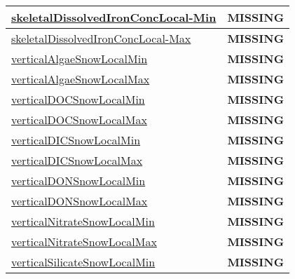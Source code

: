 {\begin{center}
\begin{longtable}{| p{2.0in} | p{4.0in} |}
    \hline
    \hyperref[subsec:var_sec_tracer_monotonicity_skeletalDissolvedIronConcLocalMin]{skeletalDissolvedIronConcLocal-}\hyperref[subsec:var_sec_tracer_monotonicity_skeletalDissolvedIronConcLocalMin]{Min  }& {\bf \color{red} MISSING} \\
    \hline
    \hyperref[subsec:var_sec_tracer_monotonicity_skeletalDissolvedIronConcLocalMax]{skeletalDissolvedIronConcLocal-}\hyperref[subsec:var_sec_tracer_monotonicity_skeletalDissolvedIronConcLocalMax]{Max  }& {\bf \color{red} MISSING} \\
    \hline
    \hyperref[subsec:var_sec_tracer_monotonicity_verticalAlgaeSnowLocalMin]{verticalAlgaeSnowLocalMin} & {\bf \color{red} MISSING} \\
    \hline
    \hyperref[subsec:var_sec_tracer_monotonicity_verticalAlgaeSnowLocalMax]{verticalAlgaeSnowLocalMax} & {\bf \color{red} MISSING} \\
    \hline
    \hyperref[subsec:var_sec_tracer_monotonicity_verticalDOCSnowLocalMin]{verticalDOCSnowLocalMin} & {\bf \color{red} MISSING} \\
    \hline
    \hyperref[subsec:var_sec_tracer_monotonicity_verticalDOCSnowLocalMax]{verticalDOCSnowLocalMax} & {\bf \color{red} MISSING} \\
    \hline
    \hyperref[subsec:var_sec_tracer_monotonicity_verticalDICSnowLocalMin]{verticalDICSnowLocalMin} & {\bf \color{red} MISSING} \\
    \hline
    \hyperref[subsec:var_sec_tracer_monotonicity_verticalDICSnowLocalMax]{verticalDICSnowLocalMax} & {\bf \color{red} MISSING} \\
    \hline
    \hyperref[subsec:var_sec_tracer_monotonicity_verticalDONSnowLocalMin]{verticalDONSnowLocalMin} & {\bf \color{red} MISSING} \\
    \hline
    \hyperref[subsec:var_sec_tracer_monotonicity_verticalDONSnowLocalMax]{verticalDONSnowLocalMax} & {\bf \color{red} MISSING} \\
    \hline
    \hyperref[subsec:var_sec_tracer_monotonicity_verticalNitrateSnowLocalMin]{verticalNitrateSnowLocalMin} & {\bf \color{red} MISSING} \\
    \hline
    \hyperref[subsec:var_sec_tracer_monotonicity_verticalNitrateSnowLocalMax]{verticalNitrateSnowLocalMax} & {\bf \color{red} MISSING} \\
    \hline
    \hyperref[subsec:var_sec_tracer_monotonicity_verticalSilicateSnowLocalMin]{verticalSilicateSnowLocalMin} & {\bf \color{red} MISSING} \\
    \hline

\end{longtable}
\end{center}}

